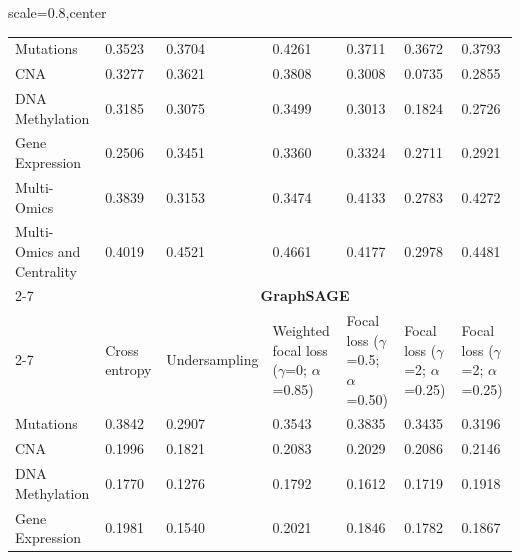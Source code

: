 \documentclass[ppgc, diss, english]{iiufrgs}
\begin{document}
\begin{landscape}
\begin{table}[!th]
\begin{adjustbox}{scale=0.8,center}
\begin{tabular}{lllllll}
Mutations                  & 0.3523        & 0.3704        & 0.4261                            & 0.3711                     & 0.3672                   & 0.3793                   \\
CNA                        & 0.3277        & 0.3621        & 0.3808                            & 0.3008                     & 0.0735                   & 0.2855                   \\
DNA Methylation            & 0.3185        & 0.3075        & 0.3499                            & 0.3013                     & 0.1824                   & 0.2726                   \\
Gene Expression            & 0.2506        & 0.3451        & 0.3360                            & 0.3324                     & 0.2711                   & 0.2921                   \\
Multi-Omics                & 0.3839        & 0.3153        & 0.3474                            & 0.4133                     & 0.2783                   & 0.4272                   \\
Multi-Omics and Centrality & 0.4019        & 0.4521        & 0.4661                            & 0.4177                     & 0.2978                   & 0.4481                   \\ \cline{2-7} 
                           & \multicolumn{6}{c}{\textbf{GraphSAGE}}                                                                                                                        \\ \cline{2-7} 
                           & Cross entropy & Undersampling & Weighted focal loss ($\gamma$=0; $\alpha$=0.85) & Focal loss ($\gamma$=0.5; $\alpha$=0.50) & Focal loss ($\gamma$=2; $\alpha$=0.25) & Focal loss ($\gamma$=2; $\alpha$=0.25) \\
Mutations                  & 0.3842        & 0.2907        & 0.3543                            & 0.3835                     & 0.3435                   & 0.3196                   \\
CNA                        & 0.1996        & 0.1821        & 0.2083                            & 0.2029                     & 0.2086                   & 0.2146                   \\
DNA Methylation            & 0.1770        & 0.1276        & 0.1792                            & 0.1612                     & 0.1719                   & 0.1918                   \\
Gene Expression            & 0.1981        & 0.1540        & 0.2021                            & 0.1846                     & 0.1782                   & 0.1867                   \\

\end{tabular}
\end{adjustbox}
\end{table}
\end{landscape}
\end{document}

